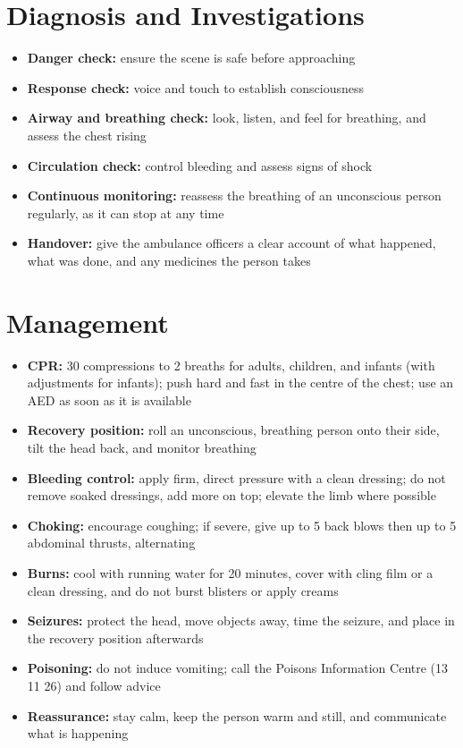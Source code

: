 \section*{Diagnosis and Investigations}
\begin{itemize}
    \item \textbf{Danger check:} ensure the scene is safe before approaching
    \item \textbf{Response check:} voice and touch to establish consciousness
    \item \textbf{Airway and breathing check:} look, listen, and feel for breathing, and assess the chest rising
    \item \textbf{Circulation check:} control bleeding and assess signs of shock
    \item \textbf{Continuous monitoring:} reassess the breathing of an unconscious person regularly, as it can stop at any time
    \item \textbf{Handover:} give the ambulance officers a clear account of what happened, what was done, and any medicines the person takes
\end{itemize}

\section*{Management}
\begin{itemize}
    \item \textbf{CPR:} 30 compressions to 2 breaths for adults, children, and infants (with adjustments for infants); push hard and fast in the centre of the chest; use an AED as soon as it is available
    \item \textbf{Recovery position:} roll an unconscious, breathing person onto their side, tilt the head back, and monitor breathing
    \item \textbf{Bleeding control:} apply firm, direct pressure with a clean dressing; do not remove soaked dressings, add more on top; elevate the limb where possible
    \item \textbf{Choking:} encourage coughing; if severe, give up to 5 back blows then up to 5 abdominal thrusts, alternating
    \item \textbf{Burns:} cool with running water for 20 minutes, cover with cling film or a clean dressing, and do not burst blisters or apply creams
    \item \textbf{Seizures:} protect the head, move objects away, time the seizure, and place in the recovery position afterwards
    \item \textbf{Poisoning:} do not induce vomiting; call the Poisons Information Centre (13 11 26) and follow advice
    \item \textbf{Reassurance:} stay calm, keep the person warm and still, and communicate what is happening
\end{itemize}

